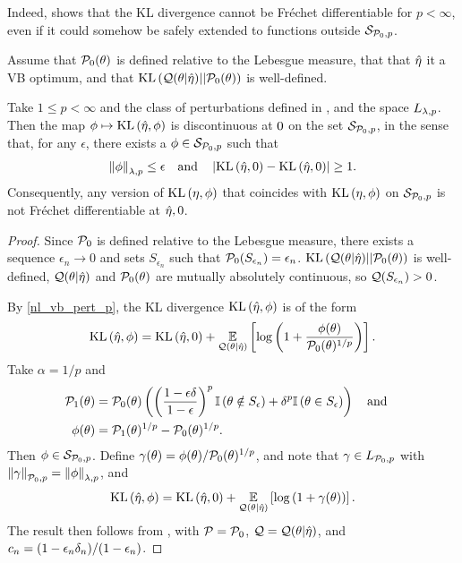 Indeed,  shows that the KL divergence cannot be
Fr{\'e}chet differentiable for $p < \infty$, even if it could somehow be safely
extended to functions outside $\mathcal{S}_{\mathcal{P}_{0},p}$.

%
\begin{cor}
%
Assume that $\mathcal{P}_{0}(\theta)$ is defined relative to the Lebesgue measure, that
that $\hat\eta$ it a VB optimum, and that $\mathrm{KL}\left(\mathcal{Q}(\theta \vert \hat\eta) ||
\mathcal{P}_{0}(\theta)\right)$ is well-defined.

Take $1 \le p < \infty$ and the class of perturbations defined in
, and the space ${L_{\lambda, p}}$.  Then the map $\phi
\mapsto \mathrm{KL}\left(\hat\eta, \phi\right)$ is discontinuous at $0$ on the set $\mathcal{S}_{\mathcal{P}_{0},p}$,
in the sense that, for any $\epsilon$, there exists a $\phi \in \mathcal{S}_{\mathcal{P}_{0},p}$ such
that
%
\begin{align*}
%
\norm{\phi}_{\lambda,p} \le \epsilon \mathand
\abs{\KL{\etaopt, \phiz} - \KL{\etaopt, \phiz}} \ge 1.
%
\end{align*}
%
Consequently, any version of $\mathrm{KL}\left(\eta, \phi\right)$ that coincides with $\mathrm{KL}\left(\eta,
\phi\right)$ on $\mathcal{S}_{\mathcal{P}_{0},p}$ is not Fr{\'e}chet differentiable at $\hat\eta, 0$.
%
\begin{proof}
%
Since $\mathcal{P}_{0}$ is defined relative to the Lebesgue measure, there exists a
sequence $\epsilon_n \rightarrow 0$ and sets $S_{\epsilon_n}$ such that
$\mathcal{P}_{0}(S_{\epsilon_n}) = \epsilon_n$.  $\mathrm{KL}\left(\mathcal{Q}(\theta \vert \hat\eta) ||
\mathcal{P}_{0}(\theta)\right)$ is well-defined, $\mathcal{Q}(\theta \vert \hat\eta)$ and
$\mathcal{P}_{0}(\theta)$ are mutually absolutely continuous, so $\mathcal{Q}(S_{\epsilon_n}) >
0$.

By \eqref{nl_vb_pert_p}, the KL divergence $\mathrm{KL}\left(\hat\eta, \phi\right)$ is of the form
%
\begin{align*}
%
\KL{\etaopt, \phi} = \KL{\etaopt, \phiz} +
\expect{\q(\theta \vert \etaopt)}{
    \log\left(1 + \frac{\phi(\theta)}{\pbase(\theta)^{1/p}}\right)
}.
%
\end{align*}
%
Take $\alpha = 1/p$ and
%
\begin{align*}
%
\palt(\theta) ={}&
    \pbase(\theta)\left(
        \left( \frac{1 - \epsilon\delta}{1 - \epsilon}\right)^{p}
        \ind{\theta \notin S_{\epsilon}} +
        \delta^{p} \ind{\theta \in S_{\epsilon}}
    \right) \mathand
\\
\phi(\theta) ={}& \palt(\theta)^{1/p} - \pbase(\theta)^{1/p}.
%
\end{align*}
%
Then $\phi \in \mathcal{S}_{\mathcal{P}_{0},p}$.   Define $\gamma(\theta) = \phi(\theta) /
\mathcal{P}_{0}(\theta)^{1/p}$, and note that $\gamma \in {L_{\mathcal{P}_{0}, p}}$ with
$\left\Vert\gamma\right\Vert_{\mathcal{P}_{0}, p} = \left\Vert\phi\right\Vert_{\lambda, p}$, and
%
\begin{align*}
%
\KL{\etaopt, \phi} = \KL{\etaopt, \phiz} +
\expect{\q(\theta \vert \etaopt)}{\log\left(1 + \gamma(\theta)\right)}.
%
\end{align*}
%
The result then follows from , with $\mathcal{P} =
\mathcal{P}_{0}$,  $\mathcal{Q} = \mathcal{Q}(\theta \vert \hat\eta)$, and $c_n = (1 - \epsilon_n \delta_n) /
(1 - \epsilon_n)$.
%
\end{proof}
%
\end{cor}
